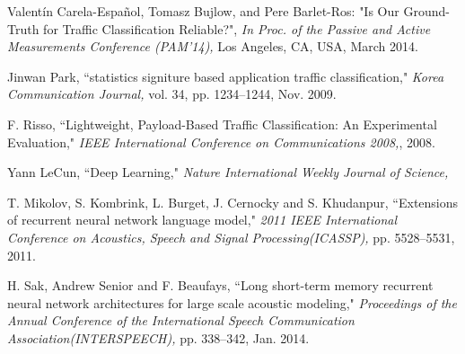\documentclass[10pt, twoside, jounal]{IEEEtran}
\begin{document}
\begin{thebibliography}{1}
Valentín Carela-Español, Tomasz Bujlow, and Pere Barlet-Ros: "Is Our Ground-Truth for Traffic Classification Reliable?",  {\it In Proc. of the Passive and Active Measurements Conference (PAM'14),} Los Angeles, CA, USA, March 2014.

Jinwan Park, ``statistics signiture based application traffic classification," {\it Korea Communication Journal,} vol. 34, pp. 1234--1244, Nov. 2009.

F. Risso, ``Lightweight, Payload-Based Traffic Classification: An Experimental Evaluation," {\it IEEE International Conference on Communications 2008,}, 2008.

Yann LeCun, ``Deep Learning," {\it Nature International Weekly Journal of Science,}

T. Mikolov, S. Kombrink, L. Burget, J. Cernocky and S. Khudanpur, ``Extensions of recurrent neural network language model," {\it 2011 IEEE International Conference on Acoustics, Speech and Signal Processing(ICASSP),} pp. 5528--5531, 2011.

H. Sak, Andrew Senior and F. Beaufays, ``Long short-term memory recurrent neural network architectures for large scale acoustic modeling," {\it Proceedings of the Annual Conference of the International Speech Communication Association(INTERSPEECH),} pp. 338--342, Jan. 2014.








\end{thebibliography}
\end{document}
